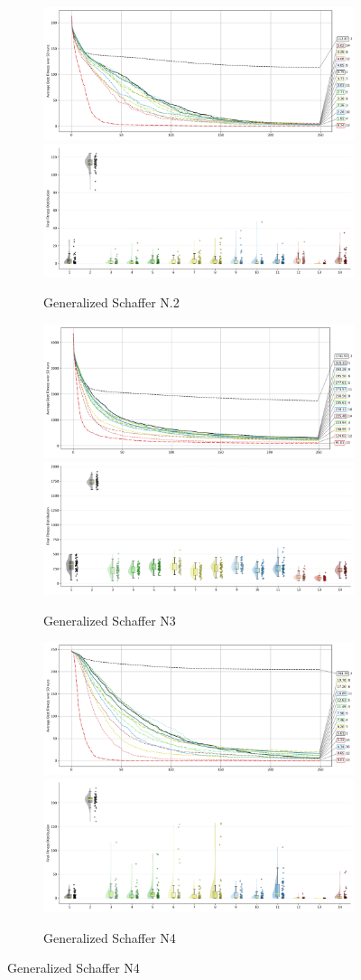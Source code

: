 \begin{figure}[p]
\begin{subfigure}{1\textwidth}
    \centering
    \includegraphics[width=.49\textwidth]{Figures/results/500/Generalized_Schaffer_N2_All_selected_algorithms_dim500_annot_legend.png}
    \includegraphics[width=.49\textwidth]{Figures/results/500/Generalized_Schaffer_N2_all_dim500_raincloud_vertical.png}
    \caption{Generalized Schaffer N.2}
\end{subfigure}

\begin{subfigure}{1\textwidth}
    \centering
    \includegraphics[width=.49\textwidth]{Figures/results/500/Generalized_Schaffer_N3_All_selected_algorithms_dim500_annot_legend.png}
    \includegraphics[width=.49\textwidth]{Figures/results/500/Generalized_Schaffer_N3_all_dim500_raincloud_vertical.png}
    \caption{Generalized Schaffer N3}
\end{subfigure}

\begin{subfigure}{1\textwidth}
    \centering
    \includegraphics[width=.49\textwidth]{Figures/results/500/Generalized_Schaffer_N4_All_selected_algorithms_dim500_annot_legend.png}
    \includegraphics[width=.49\textwidth]{Figures/results/500/Generalized_Schaffer_N4_all_dim500_raincloud_vertical.png}
    \caption{Generalized Schaffer N4}
\end{subfigure}


\end{figure}

